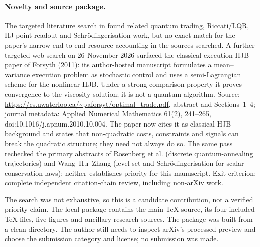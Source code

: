 \documentclass[11pt,a4paper]{article}
\begin{document}
\paragraph{Novelty and source package.}
The targeted literature search in  found related quantum trading, Riccati/LQR, HJ point-readout and
Schr\"odingerisation work, but no exact match for the paper's narrow end-to-end resource accounting in the sources searched.
A further targeted web search on 26 November 2026 surfaced the classical execution-HJB paper of Forsyth (2011): its author-hosted manuscript formulates a mean--variance execution problem as stochastic control and uses a semi-Lagrangian scheme for the nonlinear HJB. Under a strong comparison property it proves convergence to the viscosity solution; it is not a quantum algorithm. Source: \url{https://cs.uwaterloo.ca/~paforsyt/optimal_trade.pdf}, abstract and Sections~1--4; journal metadata: Applied Numerical Mathematics 61(2), 241--265, doi:10.1016/j.apnum.2010.10.004. The paper now cites it as classical HJB background and states that non-quadratic costs, constraints and signals can break the quadratic structure; they need not always do so. The same pass rechecked the primary abstracts of Rosenberg et al. (discrete quantum-annealing trajectories) and Wang--Hu--Zhang (level-set and Schr\"odingerisation for scalar conservation laws); neither establishes priority for this manuscript. Exit criterion: complete independent citation-chain review, including non-arXiv work.

The search was not exhaustive, so this is a candidate contribution, not a verified priority claim. The local package
 contains the main TeX source, its four included TeX files, five figures and ancillary research
sources. The package was built from a clean directory. The author still needs to inspect arXiv's processed preview and choose the
submission category and license; no submission was made.
\end{document}
